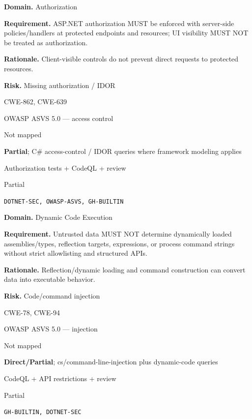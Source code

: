 \documentclass[10pt,letterpaper]{article}
\newcommand{\prioritybadge}[2]{\tcbox[on line,boxrule=0pt,arc=1.2mm,boxsep=0.7mm,left=1mm,right=1mm,top=0.4mm,bottom=0.4mm,colback=#2!12,coltext=#2]{\scriptsize\bfseries #1}}
\begin{document}
\begin{rulebox}[title={\texttt{SCS-CSHARP-AUTHZ-001} \hfill \prioritybadge{Critical Control}{Critical}}]
\textbf{Domain.} Authorization

\textbf{Requirement.} ASP.NET authorization MUST be enforced with server-side policies/handlers at protected endpoints and resources; UI visibility MUST NOT be treated as authorization.

\textbf{Rationale.} Client-visible controls do not prevent direct requests to protected resources.

\textbf{Risk.} Missing authorization / IDOR

\begin{description}[leftmargin=2.65cm,labelwidth=2.3cm,style=nextline,itemsep=1pt,topsep=3pt]
  \item[CWE] CWE-862, CWE-639
  \item[OWASP] OWASP ASVS 5.0 --- access control
  \item[CERT] Not mapped
  \item[CodeQL] \textbf{Partial}; C\# access-control / IDOR queries where framework modeling applies
  \item[Enforcement] Authorization tests + CodeQL + review
  \item[Automation] Partial
  \item[Sources] \texttt{DOTNET-SEC, OWASP-ASVS, GH-BUILTIN}
\end{description}
\end{rulebox}

\begin{rulebox}[title={\texttt{SCS-CSHARP-DYN-001} \hfill \prioritybadge{Critical Control}{Critical}}]
\textbf{Domain.} Dynamic Code Execution

\textbf{Requirement.} Untrusted data MUST NOT determine dynamically loaded assemblies/types, reflection targets, expressions, or process command strings without strict allowlisting and structured APIs.

\textbf{Rationale.} Reflection/dynamic loading and command construction can convert data into executable behavior.

\textbf{Risk.} Code/command injection

\begin{description}[leftmargin=2.65cm,labelwidth=2.3cm,style=nextline,itemsep=1pt,topsep=3pt]
  \item[CWE] CWE-78, CWE-94
  \item[OWASP] OWASP ASVS 5.0 --- injection
  \item[CERT] Not mapped
  \item[CodeQL] \textbf{Direct/Partial}; cs/command-line-injection plus dynamic-code queries
  \item[Enforcement] CodeQL + API restrictions + review
  \item[Automation] Partial
  \item[Sources] \texttt{GH-BUILTIN, DOTNET-SEC}
\end{description}
\end{rulebox}
\end{document}

